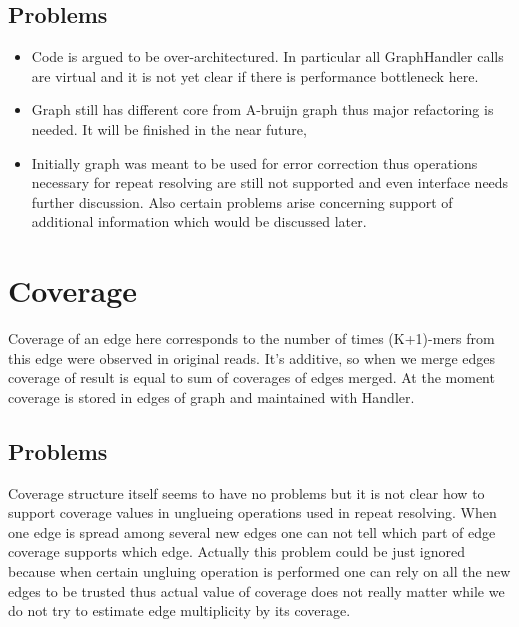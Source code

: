 \documentclass[14pt]{article}
\begin{document}
\subsection{Problems}
\begin{itemize}
\item Code is argued to be over-architectured. In particular all GraphHandler calls are virtual and it is not yet clear if there is performance bottleneck here.
\item Graph still has different core from A-bruijn graph thus major refactoring is needed. It will be finished in the near future,
\item Initially graph was meant to be used for error correction thus operations necessary for repeat resolving are still not supported and even interface needs further discussion. Also certain problems arise concerning support of additional information which would be discussed later.
\end{itemize}


\section{Coverage}

Coverage of an edge here corresponds to the number of times (K+1)-mers from this edge were observed in original reads. It's additive, so when we merge edges coverage of result is equal to sum of coverages of edges merged. At the moment coverage is stored in edges of graph and maintained with Handler.

\subsection{Problems}

Coverage structure itself seems to have no problems but it is not clear how to support coverage values in unglueing operations used in repeat resolving. When one edge is spread among several new edges one can not tell which part of edge coverage supports which edge. Actually this problem could be just ignored because when certain ungluing operation is performed one can rely on all the new edges to be trusted thus actual value of coverage does not really matter while we do not try to estimate edge multiplicity by its coverage.
\end{document}
